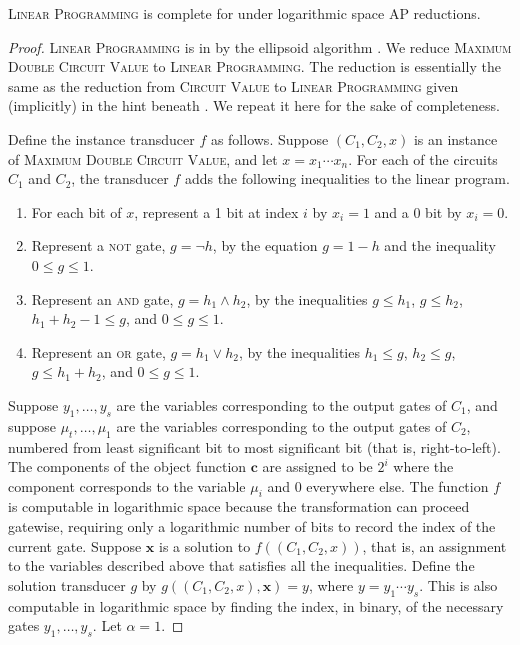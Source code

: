 \documentclass[]{article}
\begin{document}
\begin{theorem}\label{thm:lpinpo}
  \textsc{Linear Programming} is complete for \PO{} under logarithmic space AP reductions.
\end{theorem}
\begin{proof}
  \textsc{Linear Programming} is in \PO{} by the ellipsoid algorithm \cite{khachian79}.
  We reduce \textsc{Maximum Double Circuit Value} to \textsc{Linear Programming}.
  The reduction is essentially the same as the reduction from \textsc{Circuit Value} to \textsc{Linear Programming} given (implicitly) in the hint beneath \cite[Problem~A.4.1]{ghr95}.
  We repeat it here for the sake of completeness.

  Define the instance transducer $f$ as follows.
  Suppose $(C_1, C_2, x)$ is an instance of \textsc{Maximum Double Circuit Value}, and let $x = x_1 \dotsb x_n$.
  For each of the circuits $C_1$ and $C_2$, the transducer $f$ adds the following inequalities to the linear program.
  \begin{enumerate}
  \item For each bit of $x$, represent a 1 bit at index $i$ by $x_i = 1$ and a 0 bit by $x_i = 0$.
  \item Represent a \textsc{not} gate, $g = \lnot h$, by the equation $g = 1 - h$ and the inequality $0 \leq g \leq 1$.
  \item Represent an \textsc{and} gate, $g = h_1 \land h_2$, by the inequalities $g \leq h_1$, $g \leq h_2$, $h_1 + h_2 - 1 \leq g$, and $0 \leq g \leq 1$.
  \item Represent an \textsc{or} gate, $g = h_1 \lor h_2$, by the inequalities $h_1 \leq g$, $h_2 \leq g$, $g \leq h_1 + h_2$, and $0 \leq g \leq 1$.
  \end{enumerate}
  Suppose $y_1, \dotsc, y_s$ are the variables corresponding to the output gates of $C_1$, and suppose $\mu_t, \dotsc, \mu_1$ are the variables corresponding to the output gates of $C_2$, numbered from least significant bit to most significant bit (that is, right-to-left).
  The components of the object function $\mathbf{c}$ are assigned to be $2^i$ where the component corresponds to the variable $\mu_i$ and 0 everywhere else.
  The function $f$ is computable in logarithmic space because the transformation can proceed gatewise, requiring only a logarithmic number of bits to record the index of the current gate.
  Suppose $\mathbf{x}$ is a solution to $f((C_1, C_2, x))$, that is, an assignment to the variables described above that satisfies all the inequalities.
  Define the solution transducer $g$ by $g((C_1, C_2, x), \mathbf{x}) = y$, where $y = y_1 \dotsb y_s$.
  This is also computable in logarithmic space by finding the index, in binary, of the necessary gates $y_1, \dotsc, y_s$.
  Let $\alpha = 1$.


\end{proof}
\end{document}
